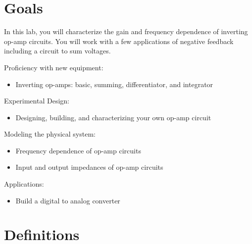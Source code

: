\documentclass[10pt]{PhysLab1C} %
\begin{document}
\maketitle %


\thispagestyle{firstpage} %


\section{Goals}

In this lab, you will characterize the gain and frequency dependence of
inverting op-amp circuits. You will work with a few applications of
negative feedback including a circuit to sum voltages.

Proficiency with new equipment:

\begin{itemize}
\item
  Inverting op-amps: basic, summing, differentiator, and integrator
\end{itemize}

Experimental Design:

\begin{itemize}
\item
  Designing, building, and characterizing your own op-amp circuit
\end{itemize}

Modeling the physical system:

\begin{itemize}
\item
  Frequency dependence of op-amp circuits
\item
  Input and output impedances of op-amp circuits
\end{itemize}

Applications:

\begin{itemize}
\item
  Build a digital to analog converter
\end{itemize}


\section{Definitions}
\end{document}
